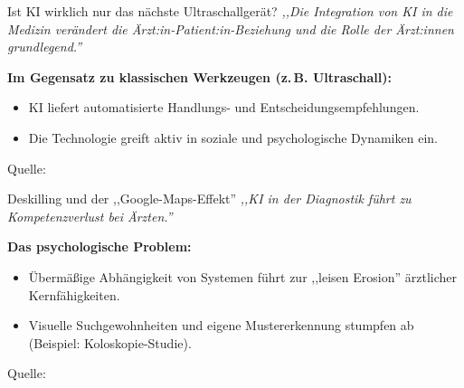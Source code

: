 \documentclass[aspectratio=169]{beamer}
\begin{document}
\begin{frame}{Ist KI wirklich nur das nächste Ultraschallgerät?}
    \textit{,,Die Integration von KI in die Medizin verändert die Ärzt:in-Patient:in-Beziehung und die Rolle der Ärzt:innen grundlegend.''} \parencite{roche2025}
    
    \vspace{0.4cm}
    \textbf{Im Gegensatz zu klassischen Werkzeugen (z.\,B. Ultraschall):}
    \begin{itemize}
        \item KI liefert automatisierte Handlungs- und Entscheidungsempfehlungen.
        \item Die Technologie greift aktiv in soziale und psychologische Dynamiken ein.
    \end{itemize}

    \vfill
    {\tiny Quelle: }
\end{frame}

\begin{frame}{Deskilling und der ,,Google-Maps-Effekt''}
    \textit{,,KI in der Diagnostik führt zu Kompetenzverlust bei Ärzten.''} \parencite{datenschutzticker2025}
    
    \vspace{0.4cm}
    \textbf{Das psychologische Problem:}
    \begin{itemize}
        \item Übermäßige Abhängigkeit von Systemen führt zur ,,leisen Erosion'' ärztlicher Kernfähigkeiten.
        \item Visuelle Suchgewohnheiten und eigene Mustererkennung stumpfen ab (Beispiel: Koloskopie-Studie).
    \end{itemize}

    \vfill
    {\tiny Quelle: }
\end{frame}
\end{document}
